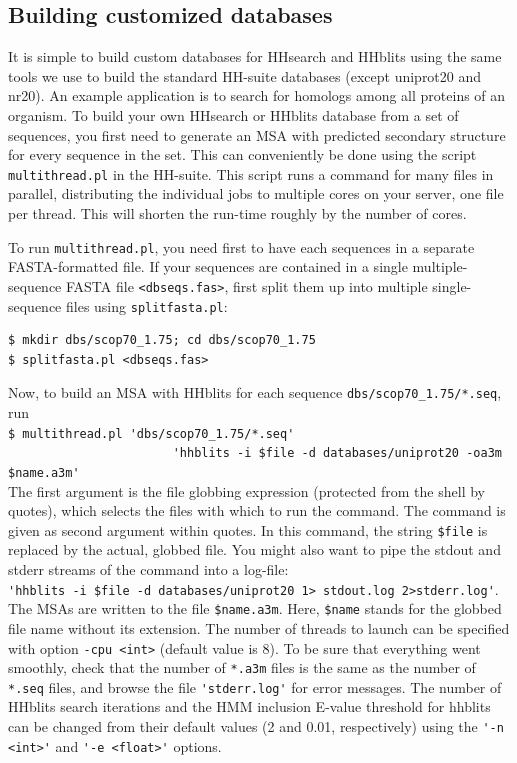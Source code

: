\documentclass[11pt,a4paper]{article}
\begin{document}
\subsection{Building customized databases} \label{building_dbs}

It is simple to build custom databases for HHsearch and HHblits using the same tools we use to build the standard HH-suite databases (except uniprot20 and nr20). An example application is to search for homologs among all proteins of an organism. To build your own HHsearch or HHblits database from a set of sequences, you first need to generate an MSA with predicted secondary structure for every sequence in the set. This can conveniently be done using the script \verb`multithread.pl` in the HH-suite. This script runs a command for many files in parallel, distributing the individual jobs to multiple cores on your server, one file per thread. This will shorten the run-time roughly by the number of cores. 

To run \verb`multithread.pl`, you need first to have each sequences in a separate FASTA-formatted file. If your sequences are contained in a single multiple-sequence FASTA file \verb`<dbseqs.fas>`, first split them up into multiple single-sequence files using \verb`splitfasta.pl`:
\begin{verbatim}
$ mkdir dbs/scop70_1.75; cd dbs/scop70_1.75
$ splitfasta.pl <dbseqs.fas> 
\end{verbatim}
Now, to build an MSA with HHblits for each sequence \verb`dbs/scop70_1.75/*.seq`, run\\[-1mm]

\verb`$ multithread.pl 'dbs/scop70_1.75/*.seq' `\\
\verb`                       'hhblits -i $file -d databases/uniprot20 -oa3m $name.a3m'`\\[-1mm]

The first argument is the file globbing expression (protected from the shell by quotes), which selects the files with which to run the command. The command is given as second argument within quotes. In this command, the string \verb`$file` is replaced by the actual, globbed file. You might also want to pipe the stdout and stderr streams of the command into a log-file:\\
\verb`'hhblits -i $file -d databases/uniprot20 1> stdout.log 2>stderr.log'`. 
The MSAs are written to the file \verb`$name.a3m`. Here, \verb`$name` stands for the globbed file name without its extension. The number of threads to launch can be specified with option \verb`-cpu <int>` (default value is 8). To be sure that everything went smoothly, check that the number of \verb`*.a3m` files is the same as the number of \verb`*.seq` files, and browse the file \verb`'stderr.log'` for error messages. The number of HHblits search iterations and the HMM inclusion E-value threshold for hhblits can be changed from their default values (2 and 0.01, respectively) using the \verb`'-n <int>'` and \verb`'-e <float>'` options.
\end{document}
